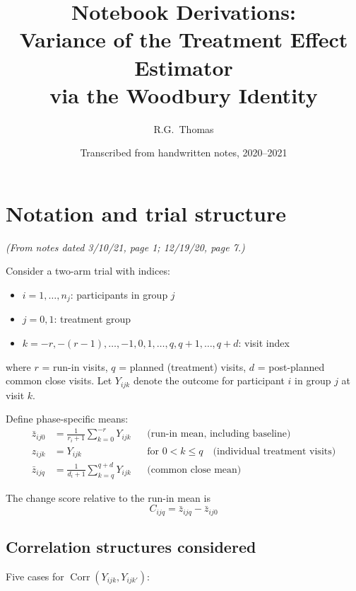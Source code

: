 \documentclass[11pt]{article}
\title{Notebook Derivations:\\
  Variance of the Treatment Effect Estimator\\
  via the Woodbury Identity}
\author{R.G.\ Thomas}
\date{Transcribed from handwritten notes, 2020--2021}
\DeclareMathOperator{\Corr}{Corr}
\begin{document}
\maketitle
\tableofcontents

\section{Notation and trial structure}
\label{sec:notation}

\noindent
\textit{(From notes dated 3/10/21, page 1; 12/19/20, page 7.)}

\medskip
\noindent
Consider a two-arm trial with indices:
\begin{itemize}
  \item $i = 1, \ldots, n_j$: participants in group $j$
  \item $j = 0, 1$: treatment group
  \item $k = -r, -(r-1), \ldots, -1, 0, 1, \ldots, q, q+1,
    \ldots, q+d$: visit index
\end{itemize}
where $r$ = run-in visits, $q$ = planned (treatment) visits,
$d$ = post-planned common close visits. Let $Y_{ijk}$ denote
the outcome for participant $i$ in group $j$ at visit $k$.

Define phase-specific means:
\begin{align}
  \bar{z}_{ij0} &= \frac{1}{r_i+1}
    \sum_{k=0}^{-r} Y_{ijk}
    & &\text{(run-in mean, including baseline)} \\
  z_{ijk} &= Y_{ijk}
    & &\text{for } 0 < k \le q
    \quad\text{(individual treatment visits)} \\
  \bar{z}_{ijq} &= \frac{1}{d_i+1}
    \sum_{k=q}^{q+d} Y_{ijk}
    & &\text{(common close mean)}
\end{align}

The change score relative to the run-in mean is
\begin{equation}
  C_{ijq} = \bar{z}_{ijq} - \bar{z}_{ij0}
\end{equation}


\subsection{Correlation structures considered}

Five cases for $\Corr(Y_{ijk}, Y_{ijk'})$:
\end{document}
